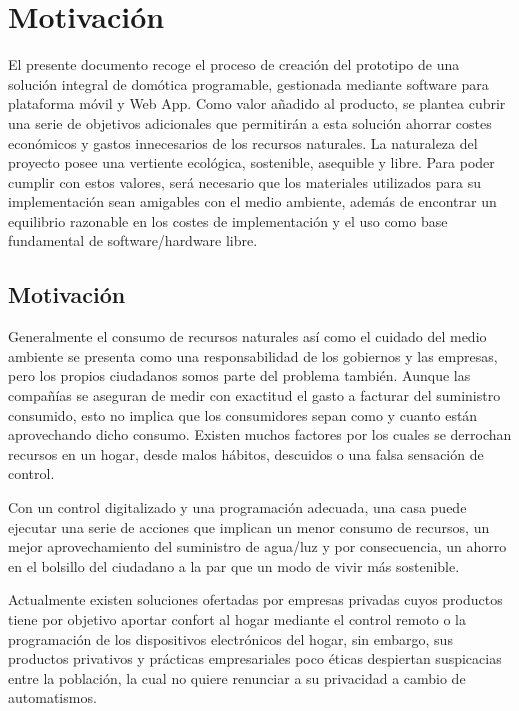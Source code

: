 \cleardoublepage

\chapter{Motivación}

\label{makereference}
El presente documento recoge el proceso de creación del prototipo de una solución integral de domótica programable, gestionada mediante software para plataforma móvil y Web App. Como valor añadido al producto, se plantea cubrir una serie de objetivos adicionales que permitirán a esta solución ahorrar costes económicos y gastos innecesarios de los recursos naturales. La naturaleza del proyecto posee una vertiente ecológica, sostenible, asequible y libre. Para poder cumplir con estos valores, será necesario que los materiales utilizados para su implementación sean amigables con el medio ambiente, además de encontrar un equilibrio razonable en los costes de implementación y el uso como base fundamental de software/hardware libre.

\section{Motivación}
\label{makereference1.1}

Generalmente el consumo de recursos naturales así como el cuidado del medio ambiente se presenta como una responsabilidad de los gobiernos y las empresas, pero los propios ciudadanos somos parte del problema también. Aunque las compañías se aseguran de medir con exactitud el gasto a facturar del suministro consumido, esto no implica que los consumidores sepan como y cuanto están aprovechando dicho consumo. Existen muchos factores por los cuales se derrochan recursos en un hogar, desde malos hábitos, descuidos o una falsa sensación de control.

Con un control digitalizado y una programación adecuada, una casa puede ejecutar una serie de acciones que implican un menor consumo de recursos, un mejor aprovechamiento del suministro de agua/luz y por consecuencia, un ahorro en el bolsillo del ciudadano a la par que un modo de vivir más sostenible.

Actualmente existen soluciones ofertadas por empresas privadas cuyos productos tiene por objetivo aportar confort al hogar mediante el control remoto o la programación de los dispositivos electrónicos del hogar, sin embargo, sus productos privativos y prácticas empresariales poco éticas despiertan suspicacias entre la población, la cual no quiere renunciar  a su privacidad a cambio de automatismos.

